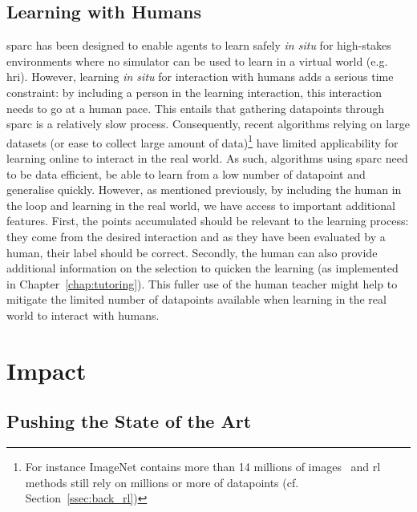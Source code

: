 \subsection{Learning with Humans}

\gls{sparc} has been designed to enable agents to learn safely \textit{in situ} for high-stakes environments where no simulator can be used to learn in a virtual world (e.g. \gls{hri}). However, learning \textit{in situ} for interaction with humans adds a serious time constraint: by including a person in the learning interaction, this interaction needs to go at a human pace. This entails that gathering datapoints through \gls{sparc} is a relatively slow process. 
Consequently, recent algorithms relying on large datasets (or ease to collect large amount of data)\footnote{For instance ImageNet contains more than 14 millions of images~\citep{russakovsky2015imagenet} and \gls{rl} methods still rely on millions or more of datapoints (cf. Section~\ref{ssec:back_rl})} have limited applicability for learning online to interact in the real world. 
As such, algorithms using \gls{sparc} need to be data efficient, be able to learn from a low number of datapoint and generalise quickly. However, as mentioned previously, by including the human in the loop and learning in the real world, we have access to important additional features. First, the points accumulated should be relevant to the learning process: they come from the desired interaction and as they have been evaluated by a human, their label should be correct. Secondly, the human can also provide additional information on the selection to quicken the learning (as implemented in Chapter~\ref{chap:tutoring}). This fuller use of the human teacher might help to mitigate the limited number of datapoints available when learning in the real world to interact with humans.

\section{Impact} \label{sec:disc_impact}

\subsection{Pushing the State of the Art}


